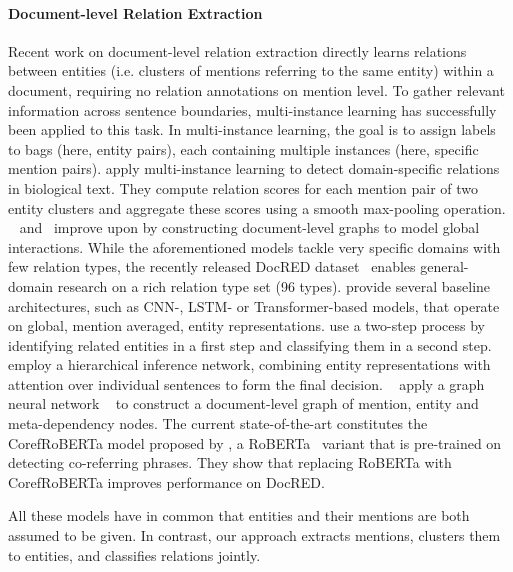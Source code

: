 \documentclass[11pt,a4paper]{article}
\begin{document}
\paragraph{Document-level Relation Extraction} Recent work on document-level relation extraction directly learns relations between entities (i.e. clusters of mentions referring to the same entity) within a document, requiring no relation annotations on mention level. To gather relevant information across sentence boundaries, multi-instance learning has successfully been applied to this task. In multi-instance learning, the goal is to assign labels to bags (here, entity pairs), each containing multiple instances (here, specific mention pairs). \citet{verga:2018:multi_instance} apply multi-instance learning to detect domain-specific relations in biological text. They compute relation scores for each mention pair of two entity clusters and aggregate these scores using a smooth max-pooling operation. ~\citet{christopoulou:2019:dots} and~\citet{sahu:2019:multi_instance_graph} improve upon \citet{verga:2018:multi_instance} by constructing document-level graphs to model global interactions. 
While the aforementioned models tackle very specific domains with few relation types, the recently released DocRED dataset~\cite{yao:2019:docred} enables general-domain research on a rich relation type set (96 types). \citet{yao:2019:docred} provide several baseline architectures, such as CNN-, LSTM- or Transformer-based models, that operate on global, mention averaged, entity representations. \citet{wang:2019:two-step-bert} use a two-step process by identifying related entities in a first step and classifying them in a second step.~\citet{Tang:2020:hin} employ a hierarchical inference network, combining entity representations with attention over individual sentences to form the final decision.
~\citet{nan:2020:bert_lsr} apply a graph neural network ~\cite{kipf:2017:gcn} to construct a document-level graph of mention, entity and meta-dependency nodes. 
The current state-of-the-art constitutes the CorefRoBERTa model proposed by \citet{ye:2020:coref_bert}, a RoBERTa~\cite{liu:2019:roberta} variant that is pre-trained on detecting co-referring phrases. They show that replacing RoBERTa with CorefRoBERTa improves performance on DocRED.

All these models have in common that entities and their mentions are both assumed to be given. In contrast, our approach extracts mentions, clusters them to entities, and classifies relations jointly. 

\newpage
\end{document}
